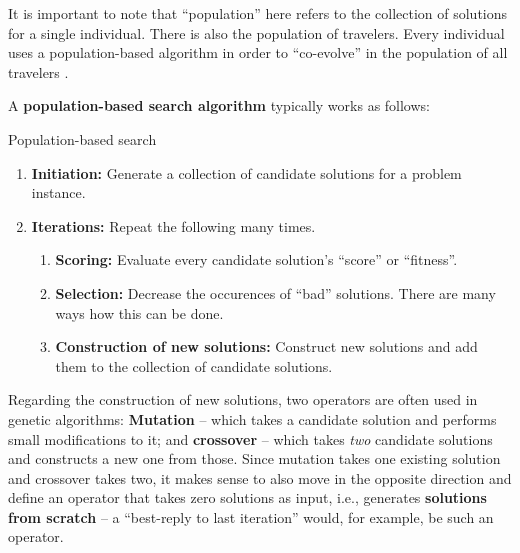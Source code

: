 It is important to note that ``population'' here refers to the
collection of solutions for a single individual.  There is also the
population of travelers.  Every individual uses a population-based
algorithm in order to ``co-evolve'' in the population of all
travelers \citep[also see][]{Balmer2007phd}.

A \textbf{population-based search algorithm} typically works as
follows:
\begin{algorithm}[H]

\caption{Population-based search}

\begin{enumerate}

\item \textbf{Initiation:} Generate a collection of candidate
  solutions for a problem instance.

\item \textbf{Iterations:} Repeat the following many times.

\begin{enumerate}

\item \textbf{Scoring:} Evaluate every candidate solution's ``score''
  or ``fitness''.

\item \textbf{Selection:} Decrease the occurences of ``bad''
  solutions.  There are many ways how this can be done.

\item \textbf{Construction of new solutions:} Construct new solutions
  and add them to the collection of candidate solutions.

\end{enumerate}

\end{enumerate}

\end{algorithm}

Regarding the construction of new solutions, two operators are often
used in genetic algorithms: \textbf{Mutation} -- which takes a
candidate solution and performs small modifications to it; and
\textbf{crossover} -- which takes \emph{two} candidate solutions and
constructs a new one from those.  Since mutation takes one existing
solution and crossover takes two, it makes sense to also move in the
opposite direction and define an operator that takes zero solutions as
input, i.e., generates \textbf{solutions from scratch} -- a
``best-reply to last iteration'' would, for example, be such an
operator.

